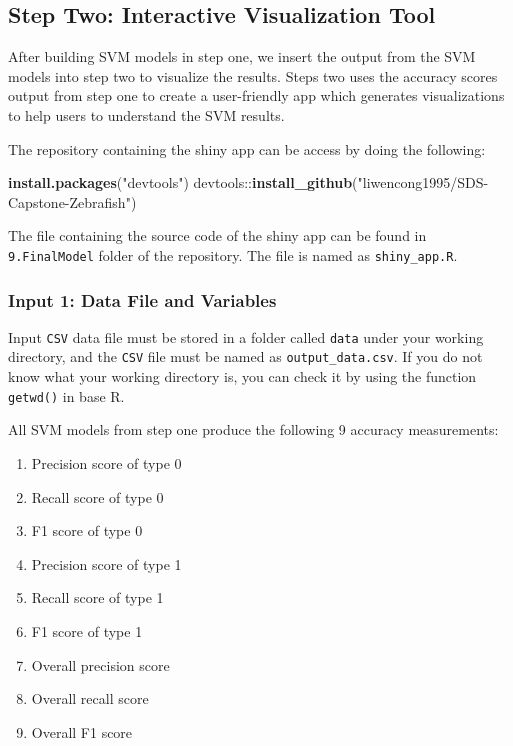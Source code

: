 \documentclass[10pt,letterpaper]{article}
\newenvironment{Shaded}{\begin{snugshade}}{\end{snugshade}}
\newcommand{\KeywordTok}[1]{\textcolor[rgb]{0.13,0.29,0.53}{\textbf{{#1}}}}
\newcommand{\StringTok}[1]{\textcolor[rgb]{0.31,0.60,0.02}{{#1}}}
\newcommand{\NormalTok}[1]{{#1}}
\providecommand{\tightlist}{%
  \setlength{\itemsep}{0pt}\setlength{\parskip}{0pt}}
\begin{document}
\subsection{Step Two: Interactive Visualization
Tool}\label{step-two-interactive-visualization-tool}

After building SVM models in step one, we insert the output from the SVM
models into step two to visualize the results. Steps two uses the
accuracy scores output from step one to create a user-friendly app which
generates visualizations to help users to understand the SVM results.

The repository containing the shiny app can be access by doing the
following:

\begin{Shaded}
\begin{Highlighting}[]
\KeywordTok{install.packages}\NormalTok{(}\StringTok{"devtools"}\NormalTok{)}
\NormalTok{devtools::}\KeywordTok{install_github}\NormalTok{(}\StringTok{"liwencong1995/SDS-Capstone-Zebrafish"}\NormalTok{)}
\end{Highlighting}
\end{Shaded}

The file containing the source code of the shiny app can be found in
\texttt{9.FinalModel} folder of the repository. The file is named as
\texttt{shiny\_app.R}.

\subsubsection{Input 1: Data File and
Variables}\label{input-1-data-file-and-variables}

Input \texttt{CSV} data file must be stored in a folder called
\texttt{data} under your working directory, and the \texttt{CSV} file
must be named as \texttt{output\_data.csv}. If you do not know what your
working directory is, you can check it by using the function
\texttt{getwd()} in base R.

All SVM models from step one produce the following 9 accuracy
measurements:

\begin{enumerate}
\def\labelenumi{\arabic{enumi}.}
\tightlist
\item
  Precision score of type 0
\item
  Recall score of type 0
\item
  F1 score of type 0
\item
  Precision score of type 1
\item
  Recall score of type 1
\item
  F1 score of type 1
\item
  Overall precision score
\item
  Overall recall score
\item
  Overall F1 score
\end{enumerate}
\end{document}
